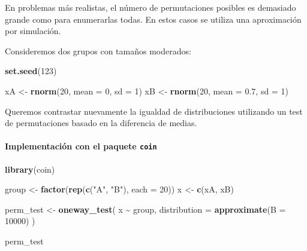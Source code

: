 \documentclass[
]{article}
\newenvironment{Shaded}{\begin{snugshade}}{\end{snugshade}}
\newcommand{\AttributeTok}[1]{\textcolor[rgb]{0.13,0.29,0.53}{#1}}
\newcommand{\DecValTok}[1]{\textcolor[rgb]{0.00,0.00,0.81}{#1}}
\newcommand{\FloatTok}[1]{\textcolor[rgb]{0.00,0.00,0.81}{#1}}
\newcommand{\FunctionTok}[1]{\textcolor[rgb]{0.13,0.29,0.53}{\textbf{#1}}}
\newcommand{\NormalTok}[1]{#1}
\newcommand{\OtherTok}[1]{\textcolor[rgb]{0.56,0.35,0.01}{#1}}
\newcommand{\SpecialCharTok}[1]{\textcolor[rgb]{0.81,0.36,0.00}{\textbf{#1}}}
\newcommand{\StringTok}[1]{\textcolor[rgb]{0.31,0.60,0.02}{#1}}
\begin{document}
En problemas más realistas, el número de permutaciones posibles es demasiado grande como para enumerarlas todas. En estos casos se utiliza una aproximación por simulación.

Consideremos dos grupos con tamaños moderados:

\begin{Shaded}
\begin{Highlighting}[]
\FunctionTok{set.seed}\NormalTok{(}\DecValTok{123}\NormalTok{)}

\NormalTok{xA }\OtherTok{\textless{}{-}} \FunctionTok{rnorm}\NormalTok{(}\DecValTok{20}\NormalTok{, }\AttributeTok{mean =} \DecValTok{0}\NormalTok{, }\AttributeTok{sd =} \DecValTok{1}\NormalTok{)}
\NormalTok{xB }\OtherTok{\textless{}{-}} \FunctionTok{rnorm}\NormalTok{(}\DecValTok{20}\NormalTok{, }\AttributeTok{mean =} \FloatTok{0.7}\NormalTok{, }\AttributeTok{sd =} \DecValTok{1}\NormalTok{)}
\end{Highlighting}
\end{Shaded}

Queremos contrastar nuevamente la igualdad de distribuciones utilizando un test de permutaciones basado en la diferencia de medias.

\paragraph{\texorpdfstring{Implementación con el paquete \texttt{coin}}{Implementación con el paquete coin}}\label{implementaciuxf3n-con-el-paquete-coin}

\begin{Shaded}
\begin{Highlighting}[]
\FunctionTok{library}\NormalTok{(coin)}

\NormalTok{group }\OtherTok{\textless{}{-}} \FunctionTok{factor}\NormalTok{(}\FunctionTok{rep}\NormalTok{(}\FunctionTok{c}\NormalTok{(}\StringTok{"A"}\NormalTok{, }\StringTok{"B"}\NormalTok{), }\AttributeTok{each =} \DecValTok{20}\NormalTok{))}
\NormalTok{x }\OtherTok{\textless{}{-}} \FunctionTok{c}\NormalTok{(xA, xB)}

\NormalTok{perm\_test }\OtherTok{\textless{}{-}} \FunctionTok{oneway\_test}\NormalTok{(}
\NormalTok{  x }\SpecialCharTok{\textasciitilde{}}\NormalTok{ group,}
  \AttributeTok{distribution =} \FunctionTok{approximate}\NormalTok{(}\AttributeTok{B =} \DecValTok{10000}\NormalTok{)}
\NormalTok{)}

\NormalTok{perm\_test}
\end{Highlighting}
\end{Shaded}
\end{document}
